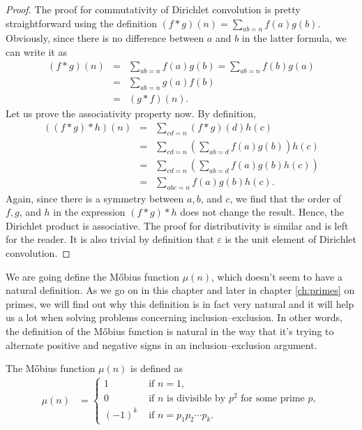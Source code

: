 \documentclass[12pt]{subfile}
\begin{document}
		\begin{proof}
			The proof for commutativity of Dirichlet convolution is pretty straightforward using the definition $(f\ast g)(n)=\displaystyle\sum_{ab=n}f(a)g(b)$. Obviously, since there is no difference between $a$ and $b$ in the latter formula, we can write it as
				\begin{eqnarray*}
					(f\ast g)(n) &=& \sum_{ab=n}f(a)g(b)= \sum_{ab=n}f(b)g(a)\\
								 &=& \sum_{ab=n}g(a)f(b)\\
								 &=& (g\ast f)(n).
				\end{eqnarray*}
			Let us prove the associativity property now. By definition,
				\begin{eqnarray*}
					((f \ast g) \ast h)(n) &=& \sum_{cd=n} (f\ast g)(d) h(c)\\
										   &=& \sum_{cd=n} \left(\sum_{ab=d} f(a)g(b)\right) h(c)\\
										   &=& \sum_{cd=n} \left(\sum_{ab=d} f(a)g(b) h(c)\right)\\
										   &=& \sum_{abc=n} f(a)g(b) h(c).
				\end{eqnarray*}
			Again, since there is a symmetry between $a,b$, and $c$, we find that the order of $f,g$, and $h$ in the expression $(f \ast g) \ast h$ does not change the result. Hence, the Dirichlet product is associative.
			The proof for distributivity is similar and is left for the reader. It is also trivial by definition that $\varepsilon$ is the unit element of Dirichlet convolution.
		\end{proof}
		
		
		We are going define the M\H obius function $\mu(n)$, which doesn't seem to have a natural definition. As we go on in this chapter and later in chapter \ref{ch:primes} on primes, we will find out why this definition is in fact very natural and it will help us a lot when solving problems concerning inclusion--exclusion. In other words, the definition of the M\H obius function is natural in the way that it's trying to alternate positive and negative signs in an inclusion--exclusion argument.

		\begin{definition}\label{def:mobius}
			The M\H obius function $\mu(n)$ is defined as
				\begin{align*}
					\mu(n) & = 
						\begin{cases}
						1&\mbox{ if }n=1,\\
						0&\mbox{ if }n
						\mbox{ is divisible by }p^2
						\mbox{ for some prime }p,\\
						(-1)^k&\mbox{ if }n=p_1p_2\cdots p_k.
						\end{cases}
				\end{align*}
		\end{definition}
		
\end{document}
